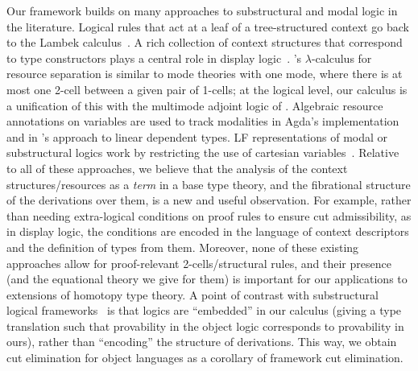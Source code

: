 Our framework builds on many approaches to substructural and modal logic
in the literature.  Logical rules that act at a leaf of a
tree-structured context go back to the Lambek
calculus~\citep{lambek58calculus}.  A rich collection of context
structures that correspond to type constructors plays a central role in
display logic~\citep{belnap82display}.  \citet{atkey04separation}'s
$\lambda$-calculus for resource separation is similar to mode theories
with one mode, where there is at most one 2-cell between a given pair of
1-cells; at the logical level, our calculus is a unification of this
with the multimode adjoint logic of
\citet{reed09adjoint}.  Algebraic resource annotations on variables are
used to track modalities in Agda's implementation~\citep{abel15modal}
and in \citet{mcbride16nuttin}'s approach to linear dependent types.  LF
representations of modal or substructural logics work by restricting the
use of cartesian variables~\citep{crary10substructural}.  Relative to
all of these approaches, we believe that the analysis of the context
structures/resources as a \emph{term} in a base type theory, and the
fibrational structure of the derivations over them, is a new and useful
observation.  For example, rather than needing extra-logical conditions
on proof rules to ensure cut admissibility, as in display logic, the
conditions are encoded in the language of context descriptors and the
definition of types from them.  Moreover, none of these existing
approaches allow for proof-relevant 2-cells/structural rules, and their
presence (and the equational theory we give for them) is important for
our applications to extensions of homotopy type theory.  A point of
contrast with substructural logical
frameworks~\citep{cervesatopfenning02llf,watkins+03clf-tr,reed09thesis}
is that logics are ``embedded'' in our calculus (giving a type
translation such that provability in the object logic corresponds to
provability in ours), rather than ``encoding'' the structure of
derivations.  This way, we obtain cut elimination for object languages
as a corollary of framework cut elimination.
